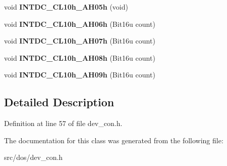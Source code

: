 \begin{DoxyCompactItemize}
\item 
\hypertarget{classdevice__CON_ab90d2371a9bc21b52843a5caf806318c}{void {\bfseries I\-N\-T\-D\-C\-\_\-\-C\-L10h\-\_\-\-A\-H05h} (void)}\label{classdevice__CON_ab90d2371a9bc21b52843a5caf806318c}

\item 
\hypertarget{classdevice__CON_a5617af033e544f08d5e890d87de00863}{void {\bfseries I\-N\-T\-D\-C\-\_\-\-C\-L10h\-\_\-\-A\-H06h} (Bit16u count)}\label{classdevice__CON_a5617af033e544f08d5e890d87de00863}

\item 
\hypertarget{classdevice__CON_a2e7c061e9163d43cbc4fe5f3856f721d}{void {\bfseries I\-N\-T\-D\-C\-\_\-\-C\-L10h\-\_\-\-A\-H07h} (Bit16u count)}\label{classdevice__CON_a2e7c061e9163d43cbc4fe5f3856f721d}

\item 
\hypertarget{classdevice__CON_a51ca1e968122673e3aad1d30677fa804}{void {\bfseries I\-N\-T\-D\-C\-\_\-\-C\-L10h\-\_\-\-A\-H08h} (Bit16u count)}\label{classdevice__CON_a51ca1e968122673e3aad1d30677fa804}

\item 
\hypertarget{classdevice__CON_aa21a9ea8d643ca136843a09c9429a07f}{void {\bfseries I\-N\-T\-D\-C\-\_\-\-C\-L10h\-\_\-\-A\-H09h} (Bit16u count)}\label{classdevice__CON_aa21a9ea8d643ca136843a09c9429a07f}

\end{DoxyCompactItemize}


\subsection{Detailed Description}


Definition at line 57 of file dev\-\_\-con.\-h.



The documentation for this class was generated from the following file\-:\begin{DoxyCompactItemize}
\item 
src/dos/dev\-\_\-con.\-h\end{DoxyCompactItemize}
